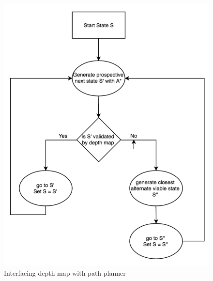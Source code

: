 \begin{figure}
  \includegraphics[width=\linewidth]{images/flowchart.png}
  \caption{Interfacing depth map with path planner}
  \label{fig:flowchart1}
\end{figure}